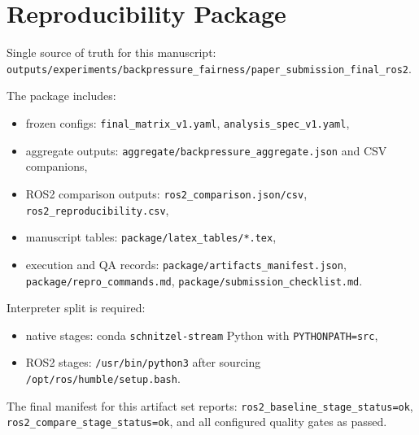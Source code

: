 \section{Reproducibility Package}
Single source of truth for this manuscript:
\texttt{outputs/experiments/backpressure\_fairness/paper\_submission\_final\_ros2}.

The package includes:
\begin{itemize}
  \item frozen configs: \texttt{final\_matrix\_v1.yaml}, \texttt{analysis\_spec\_v1.yaml},
  \item aggregate outputs: \texttt{aggregate/backpressure\_aggregate.json} and CSV companions,
  \item ROS2 comparison outputs: \texttt{ros2\_comparison.json/csv}, \texttt{ros2\_reproducibility.csv},
  \item manuscript tables: \texttt{package/latex\_tables/*.tex},
  \item execution and QA records: \texttt{package/artifacts\_manifest.json},
  \texttt{package/repro\_commands.md}, \texttt{package/submission\_checklist.md}.
\end{itemize}

Interpreter split is required:
\begin{itemize}
  \item native stages: conda \texttt{schnitzel-stream} Python with \texttt{PYTHONPATH=src},
  \item ROS2 stages: \texttt{/usr/bin/python3} after sourcing \texttt{/opt/ros/humble/setup.bash}.
\end{itemize}

The final manifest for this artifact set reports:
\texttt{ros2\_baseline\_stage\_status=ok},
\texttt{ros2\_compare\_stage\_status=ok},
and all configured quality gates as passed.
